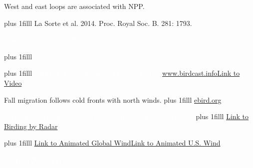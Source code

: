 \documentclass[t]{beamer}
\newcommand\imagecredit[1]{%
	\vskip0pt plus 1filll \tiny #1}%
\begin{document}
{
\begin{frame}[t,plain]{West and east loops are associated with NPP.}

	\imagecredit{\hfill La Sorte et al. 2014. Proc. Royal Soc. B. 281: 1793.}
\end{frame}
}

{
\begin{frame}[t,plain]{\textcolor{white}{Most migratory birds fly at night.}}

	\imagecredit{\textcolor{white}{www.audobon.org}}
\end{frame}
}

{
\begin{frame}[t,plain]

	\imagecredit{\textcolor{white}{NEXRAD radar mosaic, 3 October 2010. \url{www.birdcast.info}\hfill\href{https://www.youtube.com/watch?v=uPff1t4pXiI}{Link to Video}}}
\end{frame}
}


{
\begin{frame}[t,plain]{Fall migration follows cold fronts with north winds.}
	\imagecredit{\hfill\url{ebird.org}}
\end{frame}
}


{
\begin{frame}[t,plain]{\textcolor{white}{Spring migration follows southern winds from Gulf of Mexico.}}
	\imagecredit{\hfill\textcolor{white}{\href{https://people.mbi.ohio-state.edu/hurtado.10/US_Composite_Radar/}{Link to Birding by Radar}}}
\end{frame}
}

{
\begin{frame}[t,plain]{}
	\imagecredit{\href{http://earth.nullschool.net}{Link to Animated Global Wind}\hfill\href{http://hint.fm/wind/}{Link to Animated U.S. Wind}}
\end{frame}
}

{
\begin{frame}[t,plain]{\textcolor{white}{10 April 2015, 3:11 am.}}
\end{frame}
}
\end{document}
